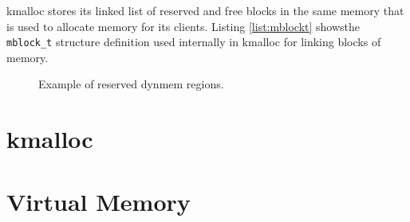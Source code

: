 kmalloc stores its linked list of reserved and free blocks in the same memory
that is used to allocate memory for its clients. Listing \ref{list:mblockt}
showsthe \verb+mblock_t+ structure definition used internally in kmalloc for
linking blocks of memory.

\begin{figure}
  
  \centering
  \caption{Example of reserved dynmem regions.}
  \label{figure:dynmem_blocks}
\end{figure}



\chapter{kmalloc}

\chapter{Virtual Memory}

